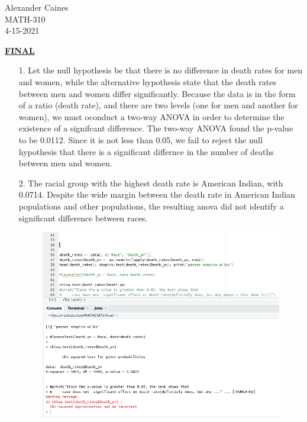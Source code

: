 \documentclass[12pt]{article}
\begin{document}
\vspace{1.0 \baselineskip}

\begin{flushright}
	Alexander Caines\\
	MATH-310\\
	4-15-2021\\
\end{flushright}

\begin{center}
	\textbf{\underline{FINAL}}
\end{center}



\begin{enumerate}
	\item[1.] Let the null hypothesis be that there is no difference in death rates for men and women, 
		while the alternative hypothesis state that the death rates between men and women differ significantly. 
		Because the data is in the form of a ratio (death rate), and there are two levels (one for men and another for women), 
		we must oconduct a two-way ANOVA in order to determine the existence of a signifcant difference. 
		The two-way ANOVA found the p-value to be 0.0112. Since it is not less than 0.05, we fail to reject
		 the null hypothesis that there is a significant differnce in the number of deaths between men and women. 
	\item[2.] The racial group with the highest death rate is American Indian, with 0.0714. Despite the wide margin 
		between the death rate in American Indian populations and other populations, the resulting anova did not 
	identify a significant difference between races.
	\begin{figure}[!h]
		\centering
		\includegraphics[width=\linewidth]{p2-p2.png}

\end{figure}
\end{enumerate}
\end{document}
